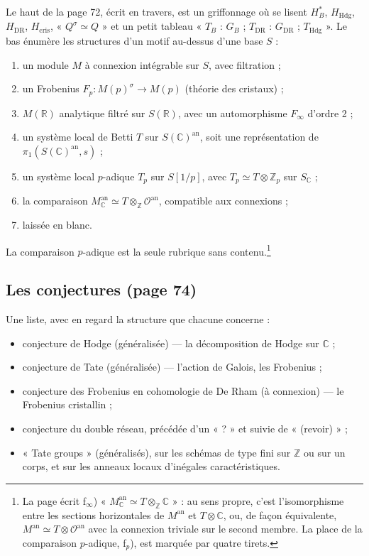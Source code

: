 \documentclass[11pt,a4paper]{article}
\begin{document}
Le haut de la page 72, écrit en travers, est un griffonnage où se lisent
$H^{*}_{B}$, $H_{\mathrm{Hdg}}$, $H_{\mathrm{DR}}$, $H_{\mathrm{cris}}$,
« $Q^{\sigma} \simeq Q$ » et un petit tableau « $T_{B}$ : $G_{B}$ ;
$T_{\mathrm{DR}}$ : $G_{\mathrm{DR}}$ ; $T_{\mathrm{Hdg}}$ ». Le bas énumère
les structures d'un motif au-dessus d'une base $S$ :

\begin{enumerate}
\item[a)] un module $M$ à connexion intégrable sur $S$, avec filtration ;
\item[b)] un Frobenius $F_{p}\colon M(p)^{\sigma} \to M(p)$ (théorie des
cristaux) ;
\item[c)] $M(\mathbb{R})$ analytique filtré sur $S(\mathbb{R})$, avec un
automorphisme $F_{\infty}$ d'ordre 2 ;
\item[d)] un système local de Betti $T$ sur $S(\mathbb{C})^{\mathrm{an}}$,
soit une représentation de $\pi_{1}(S(\mathbb{C})^{\mathrm{an}}, s)$ ;
\item[e)] un système local $p$-adique $T_{p}$ sur $S[1/p]$, avec
$T_{p} \simeq T \otimes \mathbb{Z}_{p}$ sur $S_{\mathbb{C}}$ ;
\item[f$_{\infty}$)] la comparaison $M^{\mathrm{an}}_{\mathbb{C}} \simeq T
\otimes_{\mathbb{Z}} \mathcal{O}^{\mathrm{an}}$, compatible aux connexions ;
\item[f$_{p}$)] laissée en blanc.
\end{enumerate}

La comparaison $p$-adique est la seule rubrique sans contenu.\footnote{La page écrit f$_{\infty}$) « $M^{\mathrm{an}}_{\mathbb{C}} \simeq T
\otimes_{\mathbb{Z}} \mathbb{C}$ » : au sens propre, c'est l'isomorphisme
entre les sections horizontales de $M^{\mathrm{an}}$ et $T \otimes
\mathbb{C}$, ou, de façon équivalente, $M^{\mathrm{an}} \simeq T \otimes
\mathcal{O}^{\mathrm{an}}$ avec la connexion triviale sur le second membre.
La place de la comparaison $p$-adique, f$_{p}$), est marquée par quatre
tirets.}

\subsection*{Les conjectures (page 74)}

Une liste, avec en regard la structure que chacune concerne :

\begin{itemize}
\item conjecture de Hodge (généralisée) — la décomposition de Hodge sur
$\mathbb{C}$ ;
\item conjecture de Tate (généralisée) — l'action de Galois, les Frobenius ;
\item conjecture des Frobenius en cohomologie de De Rham (à connexion) — le
Frobenius cristallin ;
\item conjecture du double réseau, précédée d'un « ? » et suivie de
« (revoir) » ;
\item « Tate groups » (généralisés), sur les schémas de type fini sur
$\mathbb{Z}$ ou sur un corps, et sur les anneaux locaux d'inégales
caractéristiques.
\end{itemize}
\end{document}
